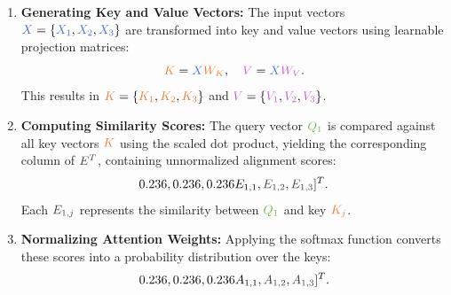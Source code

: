 \begin{enumerate}
    \item \textbf{Generating Key and Value Vectors:} The input vectors \(\textcolor[rgb]{0.267,0.447,0.769}{X} = \{\textcolor[rgb]{0.267,0.447,0.769}{X_1}, \textcolor[rgb]{0.267,0.447,0.769}{X_2}, \textcolor[rgb]{0.267,0.447,0.769}{X_3}\}\) are transformed into key and value vectors using learnable projection matrices:
    \begin{equation}
        \textcolor[rgb]{0.929,0.502,0.212}{K} = \textcolor[rgb]{0.267,0.447,0.769}{X} \textcolor[rgb]{0.929,0.502,0.212}{W_K}, \quad 
        \textcolor[rgb]{0.769,0.369,0.800}{V} = \textcolor[rgb]{0.267,0.447,0.769}{X} \textcolor[rgb]{0.769,0.369,0.800}{W_V}.
    \end{equation}
    This results in \(\textcolor[rgb]{0.929,0.502,0.212}{K} = \{\textcolor[rgb]{0.929,0.502,0.212}{K_1}, \textcolor[rgb]{0.929,0.502,0.212}{K_2}, \textcolor[rgb]{0.929,0.502,0.212}{K_3}\}\) and \(\textcolor[rgb]{0.769,0.369,0.800}{V} = \{\textcolor[rgb]{0.769,0.369,0.800}{V_1}, \textcolor[rgb]{0.769,0.369,0.800}{V_2}, \textcolor[rgb]{0.769,0.369,0.800}{V_3}\}\).
    
    \item \textbf{Computing Similarity Scores:} The query vector \(\textcolor[rgb]{0.471,0.694,0.318}{Q_1}\) is compared against all key vectors \(\textcolor[rgb]{0.929,0.502,0.212}{K}\) using the scaled dot product, yielding the corresponding column of \(\textcolor[rgb]{0.236,0.236,0.236}{E^T}\), containing unnormalized alignment scores:
    \begin{equation}
        [\textcolor[rgb]{0.236,0.236,0.236}{E_{1,1}}, \textcolor[rgb]{0.236,0.236,0.236}{E_{1,2}}, \textcolor[rgb]{0.236,0.236,0.236}{E_{1,3}}]^T.
    \end{equation}
    Each \(\textcolor[rgb]{0.236,0.236,0.236}{E_{1,j}}\) represents the similarity between \(\textcolor[rgb]{0.471,0.694,0.318}{Q_1}\) and key \(\textcolor[rgb]{0.929,0.502,0.212}{K_j}\).
    
    \item \textbf{Normalizing Attention Weights:} Applying the softmax function converts these scores into a probability distribution over the keys:
    \begin{equation}
        [\textcolor[rgb]{0.236,0.236,0.236}{A_{1,1}}, \textcolor[rgb]{0.236,0.236,0.236}{A_{1,2}}, \textcolor[rgb]{0.236,0.236,0.236}{A_{1,3}}]^T.
    \end{equation}
    

\end{enumerate}
